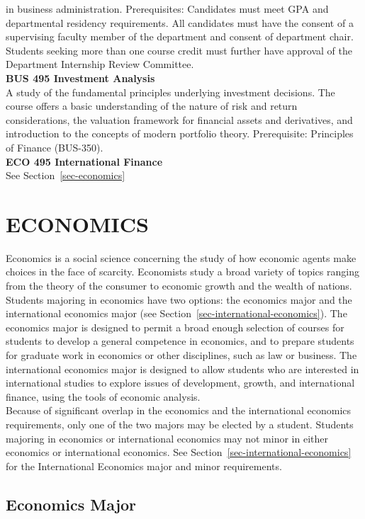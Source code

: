 \documentclass[
  letterpaper,
]{scrbook}
\begin{document}
in business administration. Prerequisites: Candidates must meet GPA and
departmental residency requirements. All candidates must have the
consent of a supervising faculty member of the department and consent of
department chair. Students seeking more than one course credit must
further have approval of the Department Internship Review Committee.\\
\textbf{BUS 495 Investment Analysis}\\
A study of the fundamental principles underlying investment decisions.
The course offers a basic understanding of the nature of risk and return
considerations, the valuation framework for financial assets and
derivatives, and introduction to the concepts of modern portfolio
theory. Prerequisite: Principles of Finance (BUS-350).\\
\textbf{ECO 495 International Finance}\\
See Section~\ref{sec-economics}

\section{ECONOMICS}\label{economics}

Economics is a social science concerning the study of how economic
agents make choices in the face of scarcity. Economists study a broad
variety of topics ranging from the theory of the consumer to economic
growth and the wealth of nations. Students majoring in economics have
two options: the economics major and the international economics major
(see Section~\ref{sec-international-economics}). The economics major is
designed to permit a broad enough selection of courses for students to
develop a general competence in economics, and to prepare students for
graduate work in economics or other disciplines, such as law or
business. The international economics major is designed to allow
students who are interested in international studies to explore issues
of development, growth, and international finance, using the tools of
economic analysis.\\
Because of significant overlap in the economics and the international
economics requirements, only one of the two majors may be elected by a
student. Students majoring in economics or international economics may
not minor in either economics or international economics. See
Section~\ref{sec-international-economics} for the International
Economics major and minor requirements.

\subsection{Economics Major}\label{economics-major}
\end{document}
